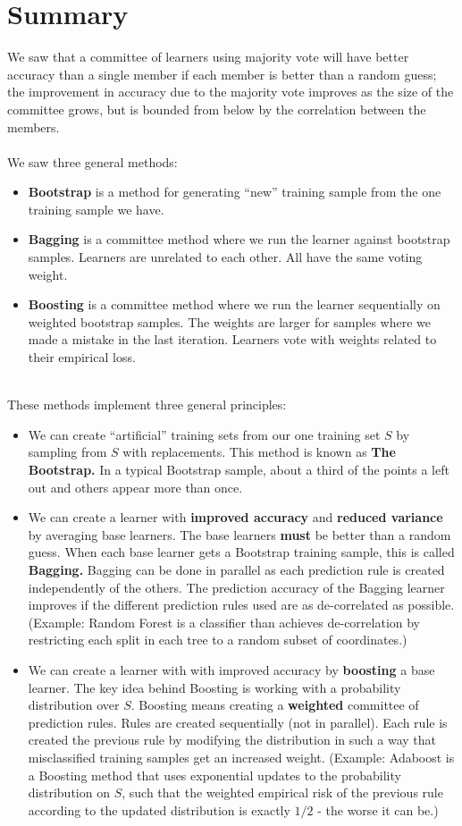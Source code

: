 \documentclass[11pt]{article}
\begin{document}
\section{Summary}
We saw that a committee of learners using majority vote 
will have better accuracy than a single
member if each member is better than a random guess; the improvement in accuracy
due to the majority vote improves as the size of the committee grows, but is
bounded from below by the correlation between the members.
\\~\\
We saw three general methods:
\begin{itemize}
  \item {\bf Bootstrap} is a method for generating ``new'' training sample from
    the one training sample we have.
  \item {\bf Bagging} is a committee method where we run the learner against
    bootstrap samples. Learners are unrelated to each other. All have the same
    voting weight.
  \item {\bf Boosting} is a committee method where we run the learner
    sequentially on weighted bootstrap samples. The weights are larger for
    samples where we made a mistake in the last iteration. Learners vote with
    weights related to their empirical loss.
\end{itemize}
~\\
These methods implement three general principles: 
\begin{itemize}
  \item We can create ``artificial'' training sets from our one training set
    $S$ by sampling from $S$ with replacements. This method is known as {\bf The
    Bootstrap.} In a typical Bootstrap sample, about a third of the points a
    left out and others appear more than once. 
  \item We can create a learner with {\bf improved accuracy} and {\bf reduced
    variance} by averaging base
    learners. The base learners {\bf must} be better than a random guess. 
  When each base learner gets a Bootstrap training sample, this is called {\bf
  Bagging.} Bagging can be done in parallel as each prediction rule is created
  independently of the others. The prediction accuracy of the Bagging learner improves if the
    different prediction rules used are as de-correlated as possible.
    (Example: Random
    Forest is a classifier than achieves de-correlation by restricting each
  split in each tree to a random subset of coordinates.)
\item We can create a learner with with improved accuracy by {\bf boosting} a base
  learner. The key idea behind Boosting is working with a probability
  distribution over $S$. Boosting means creating a {\bf weighted} committee of prediction
  rules. Rules are created sequentially (not in parallel). Each rule is created the previous rule 
  by modifying the distribution in such a way that misclassified training
  samples get an increased weight. (Example: Adaboost is a Boosting method that
    uses exponential updates to the probability distribution on $S$, such that
    the weighted empirical risk of the previous rule according to the updated
  distribution is exactly $1/2$ - the worse it can be.)
\end{itemize}
\end{document}
